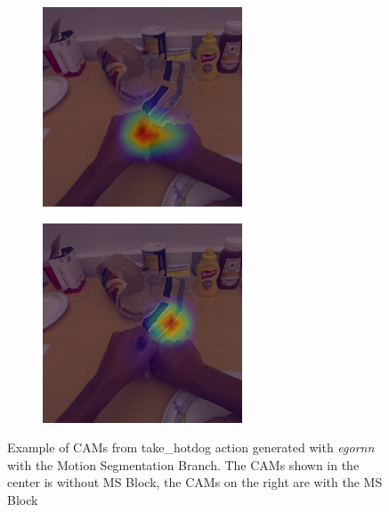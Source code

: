 \documentclass[10pt,twocolumn,hidelinks,letterpaper]{article}
\begin{document}
\begin{figure}[t]
\begin{subfigure}{.32\linewidth}
  \end{subfigure}
  \begin{subfigure}{.32\linewidth}
  	\includegraphics[width=\linewidth]{images/Cams2/S2-take_hotdog/rgb0076_CAM.png}
  \end{subfigure}
  \begin{subfigure}{.32\linewidth}
  	\includegraphics[width=\linewidth]{images/Cams2/S2-take_hotdog/rgb0076_CAM_MS.png}
  \end{subfigure}
  \caption{Example of CAMs from take\_hotdog action generated with \textit{egornn} with the Motion Segmentation Branch. The CAMs shown in the center is without MS Block, the CAMs on the right are with the MS Block}
  \label{cam2_2}
\end{figure}
\end{document}

